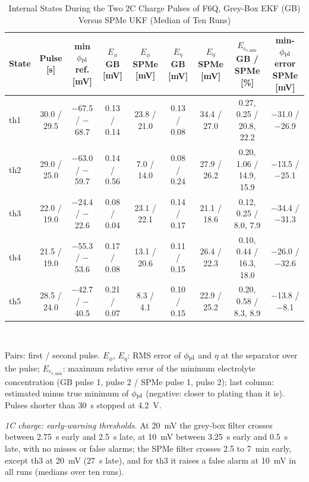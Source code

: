 \documentclass[journal]{IEEEtran}
\begin{document}
\begin{table}[t]
\centering
\caption{Internal States During the Two 2C Charge Pulses of F6Q, Grey-Box EKF (GB) Versus SPMe UKF (Median of Ten Runs)}
\label{tab:charge}
\footnotesize\setlength{\tabcolsep}{2.4pt}
\begin{tabular}{@{}lcccccccc@{}}
\toprule
State & Pulse [s] & min $\phi_{\mathrm{pl}}$ ref. [mV] & $E_{\phi}$ GB [mV] & $E_{\phi}$ SPMe [mV] & $E_\eta$ GB [mV] & $E_\eta$ SPMe [mV] & $E_{c_{\mathrm{e,min}}}$ GB / SPMe [\%] & min-$\phi_{\mathrm{pl}}$ error SPMe [mV]\\
\midrule
th1 & 30.0 / 29.5 & $-$67.5 / $-$68.7 & 0.13 / 0.14 & 23.8 / 21.0 & 0.13 / 0.08 & 34.4 / 27.0 & 0.27, 0.25 / 20.8, 22.2 & $-$31.0 / $-$26.9\\
th2 & 29.0 / 25.0 & $-$63.0 / $-$59.7 & 0.14 / 0.56 & 7.0 / 14.0 & 0.08 / 0.24 & 27.9 / 26.2 & 0.20, 1.06 / 14.9, 15.9 & $-$13.5 / $-$25.1\\
th3 & 22.0 / 19.0 & $-$24.4 / $-$22.6 & 0.08 / 0.04 & 23.1 / 22.1 & 0.14 / 0.17 & 21.1 / 18.6 & 0.12, 0.25 / 8.0, 7.9 & $-$34.4 / $-$31.3\\
th4 & 21.5 / 19.0 & $-$55.3 / $-$53.6 & 0.17 / 0.08 & 13.1 / 20.6 & 0.11 / 0.15 & 26.4 / 22.3 & 0.10, 0.44 / 16.3, 18.0 & $-$26.0 / $-$32.6\\
th5 & 28.5 / 24.0 & $-$42.7 / $-$40.5 & 0.21 / 0.07 & 8.3 / 4.1 & 0.10 / 0.15 & 22.9 / 25.2 & 0.20, 0.58 / 8.3, 8.9 & $-$13.8 / $-$8.1\\
\bottomrule
\end{tabular}\\[2pt]
\parbox{\textwidth}{\footnotesize Pairs: first / second pulse. $E_{\phi}$, $E_\eta$: RMS error of $\phi_{\mathrm{pl}}$ and $\eta$ at the separator over the pulse; $E_{c_{\mathrm{e,min}}}$: maximum relative error of the minimum electrolyte concentration (GB pulse 1, pulse 2 / SPMe pulse 1, pulse 2); last column: estimated minus true minimum of $\phi_{\mathrm{pl}}$ (negative: closer to plating than it is). Pulses shorter than \SI{30}{\second} stopped at \SI{4.2}{\volt}.}
\end{table}

\emph{1C charge: early-warning thresholds.} At \SI{+20}{\milli\volt} the grey-box filter crosses between \SI{2.75}{\second} early and \SI{2.5}{\second} late, at \SI{+10}{\milli\volt} between \SI{3.25}{\second} early and \SI{0.5}{\second} late, with no misses or false alarms; the SPMe filter crosses 2.5 to \SI{7}{\minute} early, except th3 at \SI{+20}{\milli\volt} (\SI{27}{\second} late), and for th3 it raises a false alarm at \SI{+10}{\milli\volt} in all runs (medians over ten runs).
\end{document}
